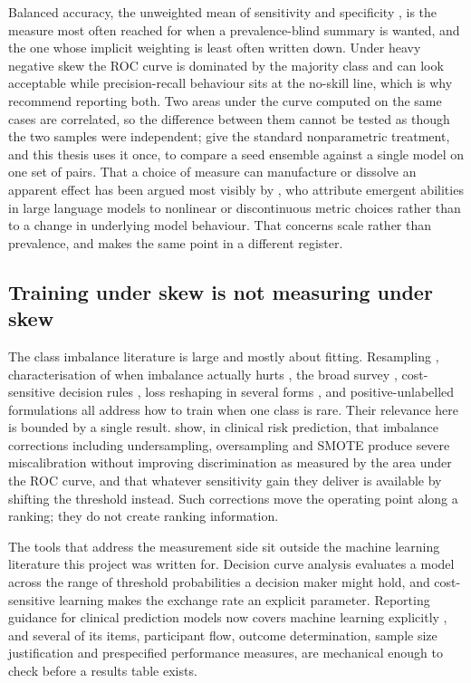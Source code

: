 Balanced accuracy, the unweighted mean of sensitivity and specificity
\citep{brodersen2010balanced}, is the measure most often reached for when a prevalence-blind
summary is wanted, and the one whose implicit weighting is least often written down. Under
heavy negative skew the ROC curve is dominated by the majority class and can look acceptable
while precision-recall behaviour sits at the no-skill line, which is why
\citet{saito2015prcurve} recommend reporting both. Two areas under the curve computed on the
same cases are correlated, so the difference between them cannot be tested as though the two
samples were independent; \citet{delong1988comparing} give the standard nonparametric
treatment, and this thesis uses it once, to compare a seed ensemble against a single model on
one set of pairs. That a choice of measure can manufacture
or dissolve an apparent effect has been argued most visibly by \citet{schaeffer2023mirage},
who attribute emergent abilities in large language models to nonlinear or discontinuous
metric choices rather than to a change in underlying model behaviour. That concerns scale
rather than prevalence, and makes the same point in a different register.

\subsection{Training under skew is not measuring under skew}

The class imbalance literature is large and mostly about fitting. Resampling
\citep{chawla2002smote}, characterisation of when imbalance actually hurts
\citep{japkowicz2002imbalance}, the broad survey \citep{he2009imbalanced}, cost-sensitive
decision rules \citep{elkan2001cost}, loss reshaping in several forms
\citep{lin2017focal,cui2019classbalanced,cao2019ldam,menon2021logitadjust}, and
positive-unlabelled formulations \citep{bekker2020pu} all address how to train when one class
is rare. Their relevance here is bounded by a single result.
\citet{vandengoorbergh2022harm} show, in clinical risk prediction, that imbalance corrections
including undersampling, oversampling and SMOTE produce severe miscalibration without
improving discrimination as measured by the area under the ROC curve, and that whatever
sensitivity gain they deliver is available by shifting the threshold instead. Such
corrections move the operating point along a ranking; they do not create ranking information.

The tools that address the measurement side sit outside the machine learning literature this
project was written for. Decision curve analysis \citep{vickers2006dca} evaluates a model
across the range of threshold probabilities a decision maker might hold, and cost-sensitive
learning \citep{elkan2001cost} makes the exchange rate an explicit parameter. Reporting
guidance for clinical prediction models now covers machine learning explicitly
\citep{collins2024tripodai}, and several of its items, participant flow, outcome
determination, sample size justification and prespecified performance measures, are
mechanical enough to check before a results table exists.

